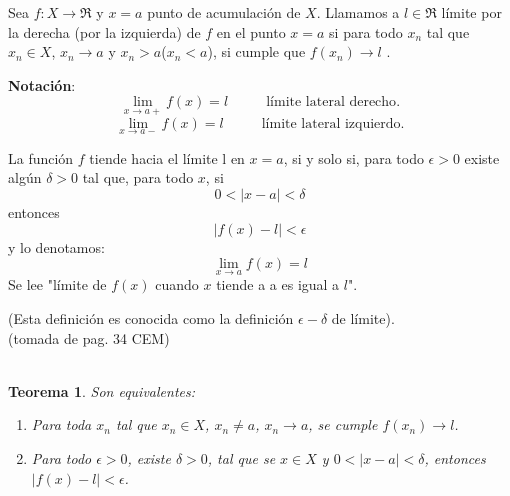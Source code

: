 \documentclass[10pt,twoside]{SelfArx} %
\begin{document}
\begin{thm}
	Sea $ f:X\rightarrow\Re $ y $ x=a $ punto de \textsf{acumulación de $ X $}. Llamamos a $ l\in\Re $ límite por la derecha (por la izquierda) de $ f $ en el punto $ x=a $ si para todo $ {x_{n}} $ tal que $ x_{n}\in X $, $ x_{n}\rightarrow a $ y $ x_{n}>a $($ x_{n}<a $), si cumple que $ f(x_{n})\rightarrow l $ .
\end{thm}
\textbf{Notación}:\\
\[ \lim\limits_{x\rightarrow a+}f(x)=l\;\;\;\;\;\;\;\;\;\ \mbox{límite lateral derecho}.\]
\[ \lim\limits_{x\rightarrow a-}f(x)=l\;\;\;\;\;\;\;\;\;\ \mbox{límite lateral izquierdo}.\]



\begin{thm}
	\label{limite}

La funci\'on $ f $ tiende hacia el l\'imite l en $ x=a $, si y solo si, para todo $ \epsilon>0 $ existe alg\'un $ \delta>0 $ tal que, para todo $ x $, si  \[ 0<|x-a|<\delta \] 
 entonces
   \[ |f(x)-l|<\epsilon  \]
    y lo denotamos:\\

\[   \lim\limits_{x\rightarrow a}f(x)=l   \]
Se lee "l\'imite de $ f(x) $ cuando $ x $ tiende a a es igual a $ l $".\\
\end{thm}
(Esta definici\'on es conocida como la definici\'on $ \epsilon-\delta $ de l\'imite).\\
(tomada de pag. 34 CEM)	\\
\\
\newtheorem{teorema}{Teorema}
\begin{teorema}\label{Teorema_equivalencia-entre_definiciones_limite}
	Son equivalentes:\\
	\begin{enumerate}
		\item [(a)]	Para toda $ {x_{n}} $ tal que $ x_{n}\in X $, $ x_{n}\neq a $, $ x_{n}\rightarrow a $, se cumple $ f(x_{n})\rightarrow l $.
		
		
		\item [(b)]	Para todo $ \epsilon>0 $, existe $ \delta>0 $, tal que se $ x\in X $ y $ 0<|x-a|<\delta $, entonces $ |f(x)-l|<\epsilon $.
		
		
	\end{enumerate}
\end{teorema}	
\end{document}

